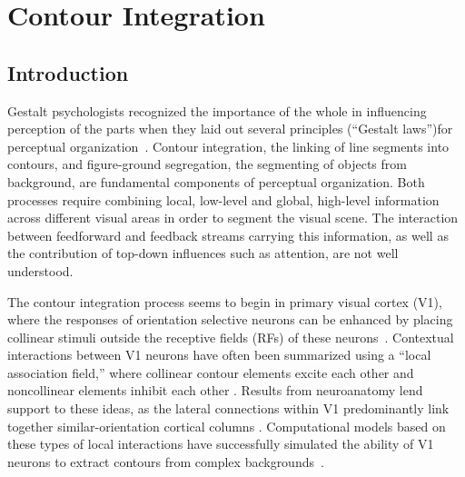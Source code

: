 \chapter{Contour Integration}
\label{sec:contour}

\section{Introduction}
\label{intro}

Gestalt psychologists recognized the importance of the whole in influencing perception of the parts when they laid out several principles (``Gestalt laws'')for perceptual organization~\citep{Wertheimer23,Koffka35}. Contour integration, the linking of line segments into contours, and figure-ground segregation, the segmenting of objects from background, are fundamental components of perceptual organization. Both processes require combining local, low-level and global, high-level information across different visual areas in order to segment the visual scene. The interaction between feedforward and feedback streams carrying this information, as well as the contribution of top-down influences such as attention, are not well understood.

The contour integration process seems to begin in primary visual cortex (V1), where the responses of orientation selective neurons can be enhanced by placing collinear stimuli outside the receptive fields (RFs) of these neurons~\citep{Stemmler_etal95a,Polat_etal98}. Contextual interactions between V1 neurons have often been summarized using a ``local association field,'' where collinear contour elements excite each other and noncollinear elements inhibit each other \citep{Ullman92, Field_etal93}. Results from neuroanatomy lend support to these ideas, as the lateral connections within V1 predominantly link together similar-orientation cortical columns \citep{Gilbert_Wiesel89,Bosking_etal97,
  Stettler_etal02}. Computational models based on these types of
local interactions have successfully simulated the ability of V1
neurons to extract contours from complex backgrounds~\citep{Li98,Yen_Finkel98,Piech_etal13}. 

